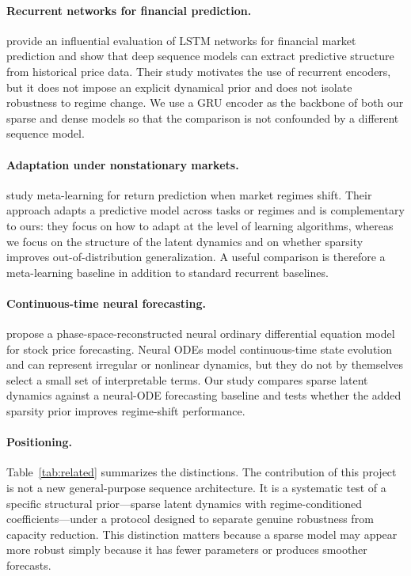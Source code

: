 \documentclass{article}
\begin{document}
\paragraph{Recurrent networks for financial prediction.}
\citet{fischer2018} provide an influential evaluation of LSTM networks for financial market prediction and show that deep sequence models can extract predictive structure from historical price data. Their study motivates the use of recurrent encoders, but it does not impose an explicit dynamical prior and does not isolate robustness to regime change. We use a GRU encoder as the backbone of both our sparse and dense models so that the comparison is not confounded by a different sequence model.

\paragraph{Adaptation under nonstationary markets.}
\citet{wang2026} study meta-learning for return prediction when market regimes shift. Their approach adapts a predictive model across tasks or regimes and is complementary to ours: they focus on how to adapt at the level of learning algorithms, whereas we focus on the structure of the latent dynamics and on whether sparsity improves out-of-distribution generalization. A useful comparison is therefore a meta-learning baseline in addition to standard recurrent baselines.

\paragraph{Continuous-time neural forecasting.}
\citet{nguyen2024} propose a phase-space-reconstructed neural ordinary differential equation model for stock price forecasting. Neural ODEs model continuous-time state evolution and can represent irregular or nonlinear dynamics, but they do not by themselves select a small set of interpretable terms. Our study compares sparse latent dynamics against a neural-ODE forecasting baseline and tests whether the added sparsity prior improves regime-shift performance.

\paragraph{Positioning.}
Table~\ref{tab:related} summarizes the distinctions. The contribution of this project is not a new general-purpose sequence architecture. It is a systematic test of a specific structural prior---sparse latent dynamics with regime-conditioned coefficients---under a protocol designed to separate genuine robustness from capacity reduction. This distinction matters because a sparse model may appear more robust simply because it has fewer parameters or produces smoother forecasts.
\end{document}
